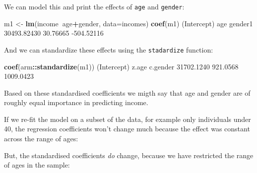 \documentclass[]{article}
\newenvironment{Shaded}{\begin{snugshade}}{\end{snugshade}}
\newcommand{\DataTypeTok}[1]{\textcolor[rgb]{0.13,0.29,0.53}{#1}}
\newcommand{\DecValTok}[1]{\textcolor[rgb]{0.00,0.00,0.81}{#1}}
\newcommand{\FloatTok}[1]{\textcolor[rgb]{0.00,0.00,0.81}{#1}}
\newcommand{\KeywordTok}[1]{\textcolor[rgb]{0.13,0.29,0.53}{\textbf{#1}}}
\newcommand{\NormalTok}[1]{#1}
\newcommand{\OperatorTok}[1]{\textcolor[rgb]{0.81,0.36,0.00}{\textbf{#1}}}
\newcommand{\StringTok}[1]{\textcolor[rgb]{0.31,0.60,0.02}{#1}}
\begin{document}
We can model this and print the effects of \texttt{age} and \texttt{gender}:

\begin{Shaded}
\begin{Highlighting}[]
\NormalTok{m1 <-}\StringTok{ }\KeywordTok{lm}\NormalTok{(income}\OperatorTok{~}\NormalTok{age}\OperatorTok{+}\NormalTok{gender, }\DataTypeTok{data=}\NormalTok{incomes)}
\KeywordTok{coef}\NormalTok{(m1)}
\NormalTok{(Intercept)         age     gender1 }
\FloatTok{30493.82430}    \FloatTok{30.76665}  \FloatTok{-504.52116} 
\end{Highlighting}
\end{Shaded}

And we can standardize these effects using the \texttt{stadardize} function:

\begin{Shaded}
\begin{Highlighting}[]
\KeywordTok{coef}\NormalTok{(arm}\OperatorTok{::}\KeywordTok{standardize}\NormalTok{(m1))}
\NormalTok{(Intercept)       z.age    c.gender }
 \FloatTok{31702.1240}    \FloatTok{921.0568}   \FloatTok{1009.0423} 
\end{Highlighting}
\end{Shaded}

Based on these standardised coefficients we migth say that age and gender are of
roughly equal importance in predicting income.

If we re-fit the model on a subset of the data, for example only individuals
under 40, the regression coefficients won't change much because the effect was
constant across the range of ages:

\begin{Shaded}
\end{Shaded}

But, the standardised coefficients \emph{do} change, because we have restricted the
range of ages in the sample:
\end{document}
